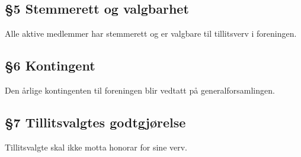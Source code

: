 \documentclass[a4paper,11pt,titlepage]{article}
\begin{document}
\subsection*{§5 Stemmerett og valgbarhet}
Alle aktive medlemmer har stemmerett og er valgbare til tillitsverv i foreningen.

\subsection*{§6 Kontingent}
Den årlige kontingenten til foreningen blir vedtatt på generalforsamlingen.

\subsection*{§7 Tillitsvalgtes godtgjørelse}
Tillitsvalgte skal ikke motta honorar for sine verv.
\end{document}
